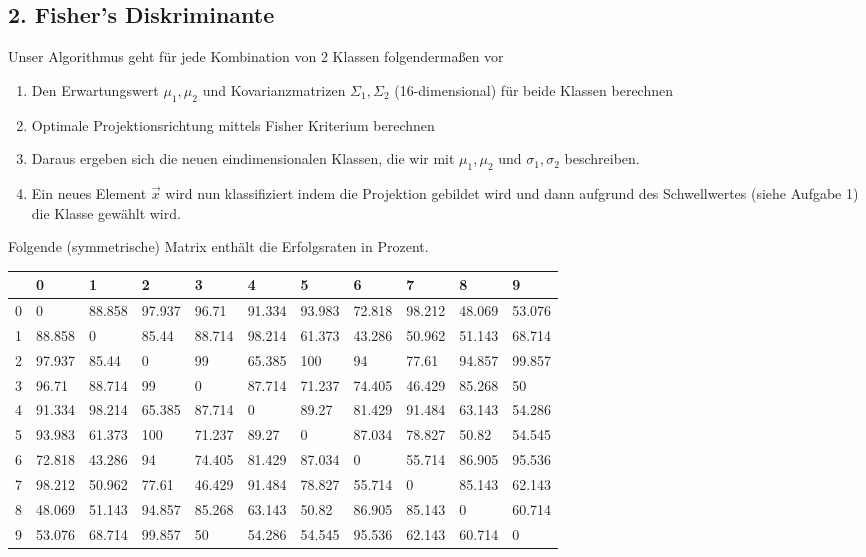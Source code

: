 \documentclass{article}
\begin{document}
\subsection*{2. Fisher's Diskriminante}

	Unser Algorithmus geht für jede Kombination von 2 Klassen folgendermaßen vor
	\begin{enumerate}
		\item Den Erwartungswert $\mu_1, \mu_2$ und Kovarianzmatrizen $\Sigma_1, \Sigma_2$ (16-dimensional) für beide Klassen berechnen
		\item Optimale Projektionsrichtung mittels Fisher Kriterium berechnen
		\item Daraus ergeben sich die neuen eindimensionalen Klassen, die wir mit $\mu_1, \mu_2$ und $\sigma_1, \sigma_2$ beschreiben.
		\item Ein neues Element $\vec{x}$ wird nun klassifiziert indem die Projektion gebildet wird und dann aufgrund des Schwellwertes (siehe Aufgabe 1) die Klasse gewählt wird.
	\end{enumerate}
	
	
	Folgende (symmetrische) Matrix enthält die Erfolgsraten in Prozent.
	\begin{table}[H]
	    \begin{tabular}{|l|l|l|l|l|l|l|l|l|l|l|}
	        \hline
	 & 0 & 1 & 2 & 3 & 4 & 5 & 6 & 7 & 8 & 9 \\ \hline
	0 & 0 & 88.858 & 97.937 & 96.71 & 91.334 & 93.983 & 72.818 & 98.212 & 48.069 & 53.076 \\
	1 & 88.858 & 0 & 85.44 & 88.714 & 98.214 & 61.373 & 43.286 & 50.962 & 51.143 & 68.714 \\
	2 & 97.937 & 85.44 & 0 & 99 & 65.385 & 100 & 94 & 77.61 & 94.857 & 99.857 \\
	3 & 96.71 & 88.714 & 99 & 0 & 87.714 & 71.237 & 74.405 & 46.429 & 85.268 & 50 \\
	4 & 91.334 & 98.214 & 65.385 & 87.714 & 0 & 89.27 & 81.429 & 91.484 & 63.143 & 54.286 \\
	5 & 93.983 & 61.373 & 100 & 71.237 & 89.27 & 0 & 87.034 & 78.827 & 50.82 & 54.545 \\
	6 & 72.818 & 43.286 & 94 & 74.405 & 81.429 & 87.034 & 0 & 55.714 & 86.905 & 95.536 \\
	7 & 98.212 & 50.962 & 77.61 & 46.429 & 91.484 & 78.827 & 55.714 & 0 & 85.143 & 62.143 \\
	8 & 48.069 & 51.143 & 94.857 & 85.268 & 63.143 & 50.82 & 86.905 & 85.143 & 0 & 60.714 \\
	9 & 53.076 & 68.714 & 99.857 & 50 & 54.286 & 54.545 & 95.536 & 62.143 & 60.714 & 0 \\
	        \hline
	    \end{tabular}
	\end{table}
	
\end{document}
